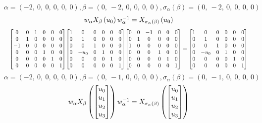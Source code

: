 \documentclass[11pt]{article}
\theoremstyle{definition}
\begin{document}
\[
\alpha = \left( -2, \  0, \  0, \  0, \  0, \  0\right), \beta = \left( 0, \  -2, \  0, \  0, \  0, \  0\right), \sigma_{\alpha}(\beta) = \left( 0, \  -2, \  0, \  0, \  0, \  0\right)
\]
\[
\scaletoalign{\textwidth}{w_{\alpha} X_{\beta}\left(u_{0}\right) w_{\alpha}^{-1} = X_{\sigma_{\alpha}\left(\beta\right)}\left(u_{0}\right)}
\]
\[
\scaletoalign{\textwidth}{{\left[\begin{matrix}0 & 0 & 1 & 0 & 0 & 0\\0 & 1 & 0 & 0 & 0 & 0\\-1 & 0 & 0 & 0 & 0 & 0\\0 & 0 & 0 & 1 & 0 & 0\\0 & 0 & 0 & 0 & 1 & 0\\0 & 0 & 0 & 0 & 0 & 1\end{matrix}\right]} {\left[\begin{matrix}1 & 0 & 0 & 0 & 0 & 0\\0 & 1 & 0 & 0 & 0 & 0\\0 & 0 & 1 & 0 & 0 & 0\\0 & - u_{0} & 0 & 1 & 0 & 0\\0 & 0 & 0 & 0 & 1 & 0\\0 & 0 & 0 & 0 & 0 & 1\end{matrix}\right]} {\left[\begin{matrix}0 & 0 & -1 & 0 & 0 & 0\\0 & 1 & 0 & 0 & 0 & 0\\1 & 0 & 0 & 0 & 0 & 0\\0 & 0 & 0 & 1 & 0 & 0\\0 & 0 & 0 & 0 & 1 & 0\\0 & 0 & 0 & 0 & 0 & 1\end{matrix}\right]} = {\left[\begin{matrix}1 & 0 & 0 & 0 & 0 & 0\\0 & 1 & 0 & 0 & 0 & 0\\0 & 0 & 1 & 0 & 0 & 0\\0 & - u_{0} & 0 & 1 & 0 & 0\\0 & 0 & 0 & 0 & 1 & 0\\0 & 0 & 0 & 0 & 0 & 1\end{matrix}\right]}}
\]
\[
\alpha = \left( -2, \  0, \  0, \  0, \  0, \  0\right), \beta = \left( 0, \  -1, \  0, \  0, \  0, \  0\right), \sigma_{\alpha}(\beta) = \left( 0, \  -1, \  0, \  0, \  0, \  0\right)
\]
\[
\scaletoalign{\textwidth}{w_{\alpha} X_{\beta}\left(\left[\begin{matrix}u_{0}\\u_{1}\\u_{2}\\u_{3}\end{matrix}\right]\right) w_{\alpha}^{-1} = X_{\sigma_{\alpha}\left(\beta\right)}\left(\left[\begin{matrix}u_{0}\\u_{1}\\u_{2}\\u_{3}\end{matrix}\right]\right)}
\]
\end{document}
